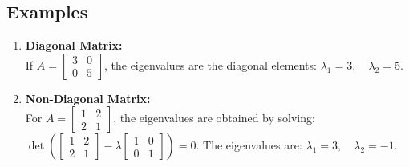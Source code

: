 \documentclass[12pt]{article}
\begin{document}
\subsection{Examples}
\begin{enumerate}
    \item \textbf{Diagonal Matrix:} \\
    If $A = \begin{bmatrix} 3 & 0 \\ 0 & 5 \end{bmatrix}$, the eigenvalues are the diagonal elements:
    $\lambda_1 = 3, \quad \lambda_2 = 5.$
    
    \item \textbf{Non-Diagonal Matrix:} \\
    For $A = \begin{bmatrix} 1 & 2 \\ 2 & 1 \end{bmatrix}$, the eigenvalues are obtained by solving:
    $\det\left(\begin{bmatrix} 1 & 2 \\ 2 & 1 \end{bmatrix} - \lambda \begin{bmatrix} 1 & 0 \\ 0 & 1 \end{bmatrix}\right) = 0.$
    The eigenvalues are:
    $\lambda_1 = 3, \quad \lambda_2 = -1.$
\end{enumerate}
\end{document}

